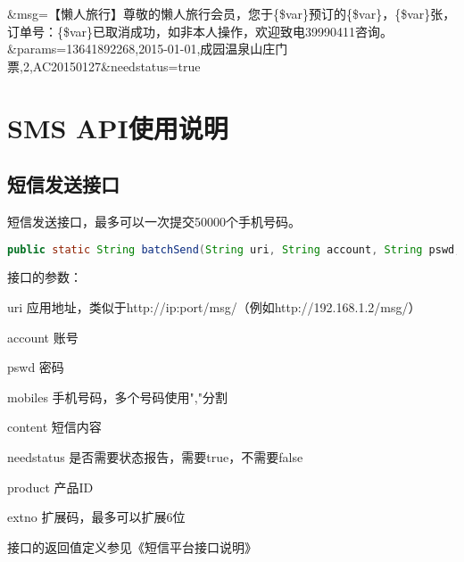 \documentclass[11pt]{book} %
\begin{document}
\&msg=【懒人旅行】尊敬的懒人旅行会员，您于\{\$var\}预订的\{\$var\}，\{\$var\}张，订单号：\{\$var\}已取消成功，如非本人操作，欢迎致电39990411咨询。\&params=13641892268,2015-01-01,成园温泉山庄门票,2,AC20150127\&needstatus=true



\part{SMS API使用说明}


\chapter{短信发送接口}

短信发送接口，最多可以一次提交50000个手机号码。

\begin{lstlisting}[language=Java]
public static String batchSend(String uri, String account, String pswd, String mobiles, String content, boolean needstatus, String product, String extno) throws Exception
\end{lstlisting}

接口的参数：

\begin{compactitem}
\item uri 应用地址，类似于http://ip:port/msg/（例如http://192.168.1.2/msg/）
\item account 账号
\item pswd 密码
\item mobiles 手机号码，多个号码使用","分割
\item content 短信内容
\item needstatus 是否需要状态报告，需要true，不需要false
\item product 产品ID
\item extno 扩展码，最多可以扩展6位
\end{compactitem}

接口的返回值定义参见《短信平台接口说明》
\end{document}
